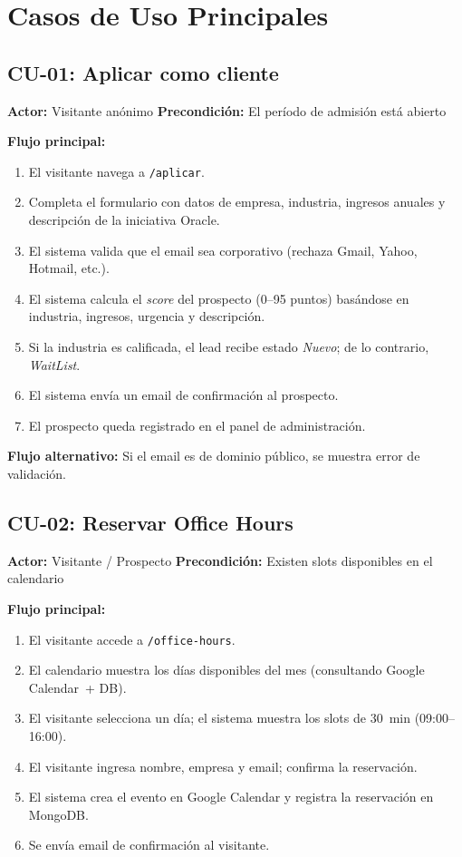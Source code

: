 \documentclass[12pt, a4paper, twoside]{report}
\begin{document}
\section{Casos de Uso Principales}

\subsection*{CU-01: Aplicar como cliente}

\textbf{Actor:} Visitante anónimo \quad
\textbf{Precondición:} El período de admisión está abierto

\textbf{Flujo principal:}
\begin{enumerate}
  \item El visitante navega a \texttt{/aplicar}.
  \item Completa el formulario con datos de empresa, industria, ingresos anuales y descripción
        de la iniciativa Oracle.
  \item El sistema valida que el email sea corporativo (rechaza Gmail, Yahoo, Hotmail, etc.).
  \item El sistema calcula el \textit{score} del prospecto (0--95 puntos) basándose en
        industria, ingresos, urgencia y descripción.
  \item Si la industria es calificada, el lead recibe estado \textit{Nuevo}; de lo contrario,
        \textit{WaitList}.
  \item El sistema envía un email de confirmación al prospecto.
  \item El prospecto queda registrado en el panel de administración.
\end{enumerate}

\textbf{Flujo alternativo:} Si el email es de dominio público, se muestra error de validación.

\subsection*{CU-02: Reservar Office Hours}

\textbf{Actor:} Visitante / Prospecto \quad
\textbf{Precondición:} Existen slots disponibles en el calendario

\textbf{Flujo principal:}
\begin{enumerate}
  \item El visitante accede a \texttt{/office-hours}.
  \item El calendario muestra los días disponibles del mes (consultando Google Calendar~+ DB).
  \item El visitante selecciona un día; el sistema muestra los slots de 30~min (09:00--16:00).
  \item El visitante ingresa nombre, empresa y email; confirma la reservación.
  \item El sistema crea el evento en Google Calendar y registra la reservación en MongoDB.
  \item Se envía email de confirmación al visitante.
\end{enumerate}
\end{document}
